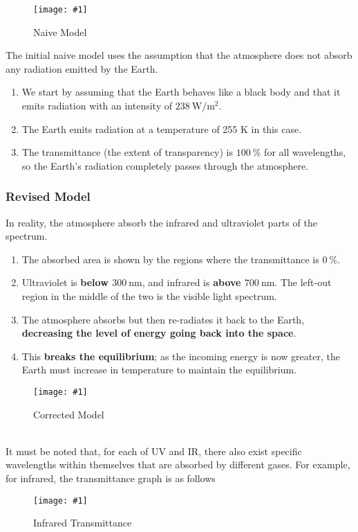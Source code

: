 \documentclass[a4paper,12pt]{article}
\newcommand{\lb}{\\[8pt]}
\newcommand{\img}[4]{\begin{center}
  \begin{figure}[H]
    \centering
    \texttt{[image: \#1]}
    \caption{#3}
    \label{fig:#4}
  \end{figure}
\end{center}}
\begin{document}
\begin{minipage}{0.35\textwidth}
  \img{naive.png}{1}{Naive Model}{naive}
\end{minipage}%
\hspace{0.05\textwidth}
\begin{minipage}{0.6\textwidth}
  The initial naive model uses the assumption that the atmosphere does not absorb any radiation emitted by the Earth.
  \begin{enumerate}
    \item We start by assuming that the Earth behaves like a black body and that it emits radiation with an intensity of $\SI{238}{\watt\per\meter\squared}$.
    \item The Earth emits radiation at a temperature of 255 K in this case.
  \end{enumerate}
\end{minipage}
\begin{enumerate}
  \setcounter{enumi}{2}
  \item The transmittance (the extent of transparency) is $\SI{100}{\percent}$ for all wavelengths, so the Earth's radiation completely passes through the atmosphere.
\end{enumerate}

\pagebreak

\subsubsection{Revised Model}

\begin{minipage}{0.6\textwidth}
  In reality, the atmosphere absorb the infrared and ultraviolet parts of the spectrum.
  \begin{enumerate}
    \item The absorbed area is shown by the regions where the transmittance is $\SI{0}{\percent}$.
    \item Ultraviolet is \textbf{below $\SI{300}{\nano\meter}$}, and infrared is \textbf{above $\SI{700}{\nano\meter}$}. The left-out region in the middle of the two is the visible light spectrum.
    \item The atmosphere absorbs but then re-radiates it back to the Earth, \textbf{decreasing the level of energy going back into the space}.
    \item This \textbf{breaks the equilibrium}; as the incoming energy is now greater, the Earth must increase in temperature to maintain the equilibrium.
  \end{enumerate}
\end{minipage}%
\hspace{0.05\textwidth}
\begin{minipage}{0.35\textwidth}
  \img{notnaive.png}{1}{Corrected Model}{corrected}
\end{minipage}
\lb
It must be noted that, for each of UV and IR, there also exist specific wavelengths within themselves that are absorbed by different gases. For example, for infrared, the transmittance graph is as follows
\img{irtransmittance} {0.8} {Infrared Transmittance} {irtransmittance}
\end{document}
